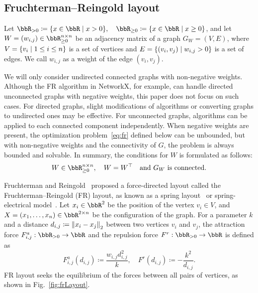 \documentclass[dvipdfmx,journal]{IEEEtran}
\newcommand{\defeq}{\coloneqq}
\begin{document}
\subsection{Fruchterman--Reingold layout}\label{ssec:frLayout}

Let $\bbR_{> 0} \defeq \qty{ x \in \bbR \mid x > 0 }, \quad \bbR_{\geq 0} \defeq \qty{ x \in \bbR \mid x \geq 0 }$, and let $W = (w_{i,j}) \in \bbR_{\geq 0}^{n \times n}$ be an adjacency matrix of a graph $G_W = (V, E)$, where $V = \qty{v_i \mid 1 \leq i \leq n}$ is a set of vertices and $E = \qty{(v_i, v_j) \mid w_{i,j} > 0}$ is a set of edges. We call $w_{i,j}$ as a weight of the edge $(v_i, v_j)$.

We will only consider undirected connected graphs with non-negative weights.
Although the FR algorithm in NetworkX, for example, can handle directed unconnected graphs with negative weights, this paper does not focus on such cases.
For directed graphs, slight modifications of algorithms or converting graphs to undirected ones may be effective.
For unconnected graphs, algorithms can be applied to each connected component independently.
When negative weights are present, the optimization problem~\eqref{eq:fr} defined below can be unbounded, but with non-negative weights and the connectivity of $G$, the problem is always bounded and solvable.
In summary, the conditions for $W$ is formulated as follows:
\begin{equation}\label{eq:WCondition}
  W \in \bbR_{\geq 0}^{n \times n}, \quad W = W^\top \quad \text{and $G_W$ is connected}.
\end{equation}

Fruchterman and Reingold~\cite{fruchtermanGraphDrawingForcedirected1991} proposed a force-directed layout called the Fruchterman--Reingold (FR) layout, as known as a spring layout~\cite{hagberg2008exploring} or spring-electrical model~\cite{Hu2006EfficientHF}.
Let $x_i \in \bbR^2$ be the position of the vertex $v_i \in V$, and $X = (x_1, \dots, x_n) \in \bbR^{2 \times n}$ be the configuration of the graph.
For a parameter $k$ and a distance $d_{i,j} \defeq \norm{x_i - x_j}_2$ between two vertices $v_i$ and $v_j$, the attraction force $F_{i,j}^a: \bbR_{> 0} \to \bbR$ and the repulsion force $F^r: \bbR_{> 0} \to \bbR$ is defined as
\begin{equation*}
  F_{i,j}^a(d_{i,j}) \defeq \frac{w_{i,j} d_{i,j}^2}{k}, \quad F^r(d_{i,j}) \defeq -\frac{k^2}{d_{i,j}}.
\end{equation*}
FR layout seeks the equilibrium of the forces between all pairs of vertices, as shown in Fig.~\ref{fig:frLayout}.
\end{document}
